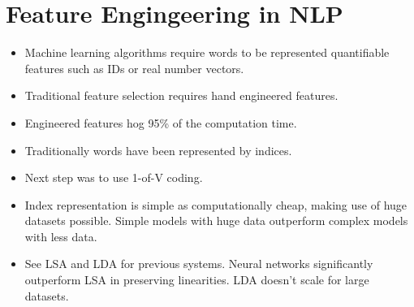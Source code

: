 \documentclass[12pt,a4paper,english
]{tutthesis}
\begin{document}
\section{Feature Engingeering in NLP}
\label{ch:feature_engineering_in_nlp}
\begin{itemize}
\item Machine learning algorithms require words to be represented quantifiable features such as IDs or real number vectors.
\item Traditional feature selection requires hand engineered features.
\item Engineered features hog 95\% of the computation time. \cite{Chen2014}
\item Traditionally words have been represented by indices. \cite{Mikolov2013}
\item Next step was to use 1-of-V coding.
\item Index representation is simple as computationally cheap, making use of huge datasets possible. Simple models with huge data outperform complex models with less data. \cite{Mikolov2013}
\item See LSA and LDA for previous systems. Neural networks significantly outperform LSA in preserving linearities. LDA doesn't scale for large datasets. \cite{Mikolov2013}
\end{itemize}
\end{document}
